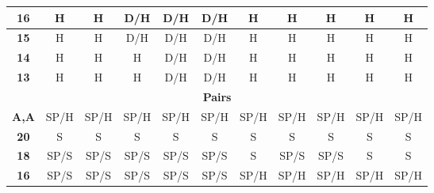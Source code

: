 \documentclass[conference]{IEEEtran}
\begin{document}
\begin{table}[htbp]
\begin{tabular}{|c|c|c|c|c|c|c|c|c|c|c|}
\textbf{16} & \cellcolor[HTML]{FE0000}H & \cellcolor[HTML]{FE0000}H & \cellcolor[HTML]{FFC702}D/H & \cellcolor[HTML]{FFC702}D/H & \cellcolor[HTML]{FFC702}D/H & \cellcolor[HTML]{FE0000}H & \cellcolor[HTML]{FE0000}H & \cellcolor[HTML]{FE0000}H & \cellcolor[HTML]{FE0000}H & \cellcolor[HTML]{FE0000}H \\ \hline
\textbf{15} & \cellcolor[HTML]{FE0000}H & \cellcolor[HTML]{FE0000}H & \cellcolor[HTML]{FFC702}D/H & \cellcolor[HTML]{FFC702}D/H & \cellcolor[HTML]{FFC702}D/H & \cellcolor[HTML]{FE0000}H & \cellcolor[HTML]{FE0000}H & \cellcolor[HTML]{FE0000}H & \cellcolor[HTML]{FE0000}H & \cellcolor[HTML]{FE0000}H \\ \hline
\textbf{14} & \cellcolor[HTML]{FE0000}H & \cellcolor[HTML]{FE0000}H & \cellcolor[HTML]{FE0000}H & \cellcolor[HTML]{FFC702}D/H & \cellcolor[HTML]{FFC702}D/H & \cellcolor[HTML]{FE0000}H & \cellcolor[HTML]{FE0000}H & \cellcolor[HTML]{FE0000}H & \cellcolor[HTML]{FE0000}H & \cellcolor[HTML]{FE0000}H \\ \hline
\textbf{13} & \cellcolor[HTML]{FE0000}H & \cellcolor[HTML]{FE0000}H & \cellcolor[HTML]{FE0000}H & \cellcolor[HTML]{FFC702}D/H & \cellcolor[HTML]{FFC702}D/H & \cellcolor[HTML]{FE0000}H & \cellcolor[HTML]{FE0000}H & \cellcolor[HTML]{FE0000}H & \cellcolor[HTML]{FE0000}H & \cellcolor[HTML]{FE0000}H \\ \hline
\multicolumn{11}{|c|}{\textbf{Pairs}} \\ \hline
\textbf{A,A} & \cellcolor[HTML]{F8FF00}SP/H & \cellcolor[HTML]{F8FF00}SP/H & \cellcolor[HTML]{F8FF00}SP/H & \cellcolor[HTML]{F8FF00}SP/H & \cellcolor[HTML]{F8FF00}SP/H & \cellcolor[HTML]{F8FF00}SP/H & \cellcolor[HTML]{F8FF00}SP/H & \cellcolor[HTML]{F8FF00}SP/H & \cellcolor[HTML]{F8FF00}SP/H & \cellcolor[HTML]{F8FF00}SP/H \\ \hline
\textbf{20} & \cellcolor[HTML]{32CB00}S & \cellcolor[HTML]{32CB00}S & \cellcolor[HTML]{32CB00}S & \cellcolor[HTML]{32CB00}S & \cellcolor[HTML]{32CB00}S & \cellcolor[HTML]{32CB00}S & \cellcolor[HTML]{32CB00}S & \cellcolor[HTML]{32CB00}S & \cellcolor[HTML]{32CB00}S & \cellcolor[HTML]{32CB00}S \\ \hline
\textbf{18} & \cellcolor[HTML]{F8FF00}SP/S & \cellcolor[HTML]{F8FF00}SP/S & \cellcolor[HTML]{F8FF00}SP/S & \cellcolor[HTML]{F8FF00}SP/S & \cellcolor[HTML]{F8FF00}SP/S & \cellcolor[HTML]{32CB00}S & \cellcolor[HTML]{F8FF00}SP/S & \cellcolor[HTML]{F8FF00}SP/S & \cellcolor[HTML]{32CB00}S & \cellcolor[HTML]{32CB00}S \\ \hline
\textbf{16} & \cellcolor[HTML]{F8FF00}SP/S & \cellcolor[HTML]{F8FF00}SP/S & \cellcolor[HTML]{F8FF00}SP/S & \cellcolor[HTML]{F8FF00}SP/S & \cellcolor[HTML]{F8FF00}SP/S & \cellcolor[HTML]{F8FF00}SP/H & \cellcolor[HTML]{F8FF00}SP/H & \cellcolor[HTML]{F8FF00}SP/H & \cellcolor[HTML]{F8FF00}SP/H & \cellcolor[HTML]{F8FF00}SP/H \\ \hline

\end{tabular}
\end{table}
\end{document}
